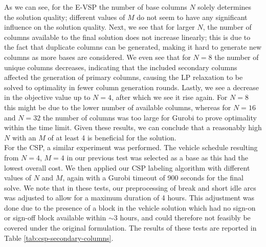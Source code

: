 \documentclass[]{article}
\begin{document}
As we can see, for the E-VSP the number of base columns $N$ solely determines the solution quality; different values of $M$ do not seem to have any significant influence on the solution quality. Next, we see that for larger $N$, the number of columns available to the final solution does not increase linearly; this is due to the fact that duplicate columns can be generated, making it hard to generate new columns as more bases are considered. We even see that for $N=8$ the number of unique columns decreases, indicating that the included secondary columns affected the generation of primary columns, causing the LP relaxation to be solved to optimality in fewer column generation rounds. Lastly, we see a decrease in the objective value up to $N=4$, after which we see it rise again. For $N=8$ this might be due to the lower number of available columns, whereas for $N=16$ and $N=32$ the number of columns was too large for Gurobi to prove optimality within the time limit. Given these results, we can conclude that a reasonably high $N$ with an $M$ of at least 4 is beneficial for the solution. \\

\noindent For the CSP, a similar experiment was performed. The vehicle schedule resulting from $N=4$, $M=4$ in our previous test was selected as a base as this had the lowest overall cost. We then applied our CSP labeling algorithm with different values of $N$ and $M$, again with a Gurobi timeout of 900 seconds for the final solve. We note that in these tests, our preprocessing of break and short idle arcs was adjusted to allow for a maximum duration of 4 hours. This adjustment was done due to the presence of a block in the vehicle solution which had no sign-on or sign-off block available within $\sim3$ hours, and could therefore not feasibly be covered under the original formulation. The results of these tests are reported in Table \ref{tab:csp-secondary-columns}.
\end{document}
